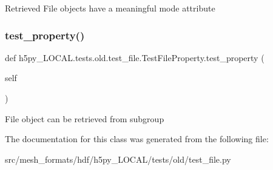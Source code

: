 \begin{DoxyVerb}Retrieved File objects have a meaningful mode attribute \end{DoxyVerb}
 \mbox{\label{classh5py__LOCAL_1_1tests_1_1old_1_1test__file_1_1TestFileProperty_a73ac7d6211c1fa0c87f9ed29c4a4afdb}} 
\subsubsection{\texorpdfstring{test\+\_\+property()}{test\_property()}}
{\footnotesize\ttfamily def h5py\+\_\+\+L\+O\+C\+A\+L.\+tests.\+old.\+test\+\_\+file.\+Test\+File\+Property.\+test\+\_\+property (\begin{DoxyParamCaption}\item[{}]{self }\end{DoxyParamCaption})}

\begin{DoxyVerb}File object can be retrieved from subgroup \end{DoxyVerb}
 

The documentation for this class was generated from the following file\+:\begin{DoxyCompactItemize}
\item 
src/mesh\+\_\+formats/hdf/h5py\+\_\+\+L\+O\+C\+A\+L/tests/old/test\+\_\+file.\+py\end{DoxyCompactItemize}

